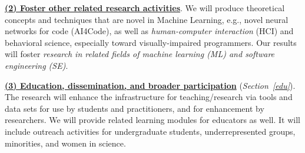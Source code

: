 \noindent\underline{{\bf (2) Foster other related research
    activities}}. We will produce theoretical concepts and techniques
that are novel in Machine Learning, e.g., novel neural networks for
code (AI4Code), as well as {\em human-computer interaction} (HCI) and
behavioral science, especially toward visually-impaired
programmers. Our results will foster {\em research in related fields
  of {\em machine learning} (ML) and {\em software engineering} (SE)}.


\noindent\underline{{\bf (3) Education, dissemination, and broader
    participation}} ({\em Section~\ref{edu}}). The research will enhance the
infrastructure for teaching/research via tools and data sets for use
by students and practitioners, and for enhancement by researchers. We
will provide related learning modules for educators as well. It will
include outreach activities for undergraduate students,
underrepresented groups, minorities, and women in science.
